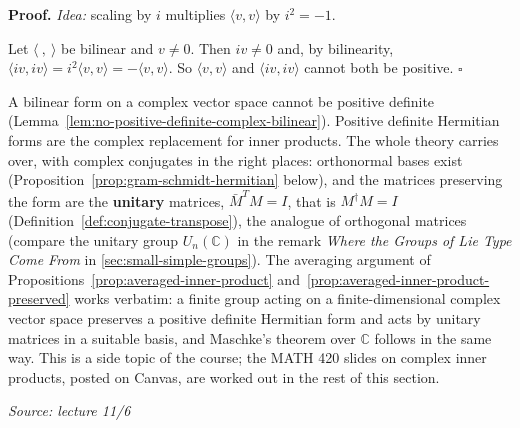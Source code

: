 \documentclass[11pt]{report}
\renewenvironment{proof}[1][Proof]{\noindent\textbf{#1.} }{\hfill$\square$\par\vspace{5pt}}
\newcommand{\srcline}[1]{\par\hfill{\footnotesize\textit{Source: #1}}}
\begin{document}
\begin{proof}
\textit{Idea:} scaling by $i$ multiplies $\langle v, v \rangle$ by $i^2 = -1$.\par
Let $\langle\ ,\ \rangle$ be bilinear and $v \neq 0$. Then $iv \neq 0$ and, by bilinearity, $\langle iv, iv \rangle = i^2 \langle v, v \rangle = -\langle v, v \rangle$. So $\langle v, v \rangle$ and $\langle iv, iv \rangle$ cannot both be positive.
\end{proof}

\begin{rembox}\label{rem:why-not-bilinear-unitary}
A bilinear form on a complex vector space cannot be positive definite (Lemma~\ref{lem:no-positive-definite-complex-bilinear}). Positive definite Hermitian forms are the complex replacement for inner products. The whole theory carries over, with complex conjugates in the right places: orthonormal bases exist (Proposition~\ref{prop:gram-schmidt-hermitian} below), and the matrices preserving the form are the \textbf{unitary} matrices, $\bar M^T M = I$, that is $M^\dagger M = I$ (Definition~\ref{def:conjugate-transpose}), the analogue of orthogonal matrices (compare the unitary group $U_n(\mathbb{C})$ in the remark \emph{Where the Groups of Lie Type Come From} in \ref{sec:small-simple-groups}). The averaging argument of Propositions~\ref{prop:averaged-inner-product} and~\ref{prop:averaged-inner-product-preserved} works verbatim: a finite group acting on a finite-dimensional complex vector space preserves a positive definite Hermitian form and acts by unitary matrices in a suitable basis, and Maschke's theorem over $\mathbb{C}$ follows in the same way. This is a side topic of the course; the MATH 420 slides on complex inner products, posted on Canvas, are worked out in the rest of this section.
\srcline{lecture 11/6}
\end{rembox}
\end{document}
